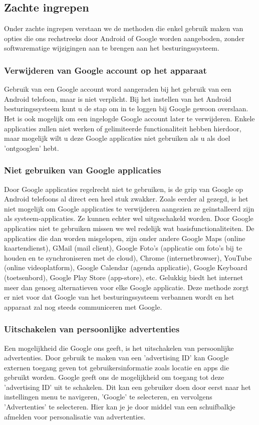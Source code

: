 \subsection{Zachte ingrepen}

Onder zachte ingrepen verstaan we de methoden die enkel gebruik maken van opties die ons rechstreeks door Android of Google worden aangeboden, zonder softwarematige wijzigingen aan te brengen aan het besturingssysteem.

\subsubsection{Verwijderen van Google account op het apparaat}

Gebruik van een Google account word aangeraden bij het gebruik van een Android telefoon, maar is niet verplicht. Bij het instellen van het Android besturingssysteem kunt u de stap om in te loggen bij Google gewoon overslaan. Het is ook mogelijk om een ingelogde Google account later te verwijderen. Enkele applicaties zullen niet werken of gelimiteerde functionaliteit hebben hierdoor, maar mogelijk wilt u deze Google applicaties niet gebruiken als u als doel 'ontgooglen' hebt.

\subsubsection{Niet gebruiken van Google applicaties}
Door Google applicaties regelrecht niet te gebruiken, is de grip van Google op Android telefoons al direct een heel stuk zwakker.
Zoals eerder al gezegd, is het niet mogelijk om Google applicaties te verwijderen aangezien ze geïnstalleerd zijn als systeem-applicaties. Ze kunnen echter wel uitgeschakeld worden. Door Google applicaties niet te gebruiken missen we wel redelijk wat basisfunctionaliteiten. De applicaties die dan worden misgelopen, zijn onder andere Google Maps (online kaartendienst), GMail (mail client), Google Foto's (applicatie om foto's bij te houden en te synchroniseren met de cloud), Chrome (internetbrowser), YouTube (online videoplatform), Google Calendar (agenda applicatie), Google Keyboard (toetsenbord), Google Play Store (app-store), etc.  Gelukkig biedt het internet meer dan genoeg alternatieven voor elke Google applicatie. Deze methode zorgt er niet voor dat Google van het besturingssysteem verbannen wordt en het apparaat zal nog steeds communiceren met Google.

\subsubsection{Uitschakelen van persoonlijke advertenties}
Een mogelijkheid die Google ons geeft, is het uitschakelen van persoonlijke advertenties. Door gebruik te maken van een 'advertising ID' kan Google externen toegang geven tot gebruikersinformatie zoals locatie en apps die gebruikt worden. Google geeft ons de mogelijkheid om toegang tot deze 'advertising ID' uit te schakelen. Dit kan een gebruiker doen door eerst naar het instellingen menu te navigeren, 'Google' te selecteren, en vervolgens 'Advertenties' te selecteren. Hier kan je je door middel van een schuifbalkje afmelden voor personalisatie van advertenties. \autocite{knight_degoogle}

